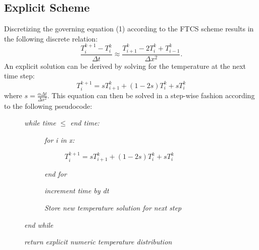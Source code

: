\documentclass[twocolumn,10pt]{asme2ej}
\begin{document}
\subsection{Explicit Scheme}
Discretizing the governing equation (1) according to the FTCS scheme results in the following discrete relation:
\begin{equation}
\frac{T_i^{k+1}-T_i^k}{\Delta t} \approx \frac{T_{i+1}^k - 2T_i^k + T_{i-1}^k}{\Delta x^2}.
\label{eq_EXPDISCRETE}
\end{equation}
\noindent An explicit solution can be derived by solving for the temperature at the next time step:
\begin{equation}
T_i^{k+1} = sT_{i+1}^k +(1- 2s)T_i^k + sT_{i}^k
\label{eq_EXPSOLN}
\end{equation}
\noindent where $s = \frac{\alpha \Delta t}{\Delta x^2}$.  This equation can then be solved in a step-wise fashion according to the following pseudocode:
\begin{description}
\item[] \emph{while time $\leq$ end time:}
	\begin{description}
	\item[] \emph{for i in x:}
		\begin{description}
		\item[] $T_i^{k+1} = sT_{i+1}^k +(1- 2s)T_i^k + sT_{i}^k$
		\end{description}
	\item[] \emph{end for}
	\item[] \emph{increment time by dt}
	\item[] \emph{Store new temperature solution for next step}
	\end{description}
\item[] \emph{end while}
\item[] \emph{return explicit numeric temperature distribution}
\end{description}
\end{document}
